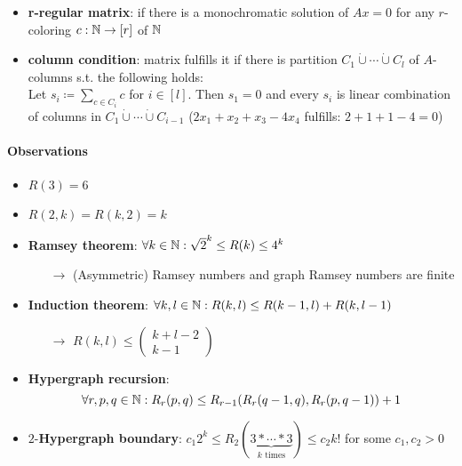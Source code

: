 \begin{itemize}
  \item \textbf{r-regular matrix}: if there is a monochromatic solution of \( Ax = 0 \) for any \( r \)-coloring \( c: \mathbb{N} \to [r] \) of \( \mathbb{N} \)
  \item \textbf{column condition}: matrix fulfills it if there is partition \( C_1 \dot{\cup} \cdots \dot{\cup} C_l \) of \( A \)-columns s.t. the following holds: \\
  Let \( s_i \coloneqq \sum_{c \in C_i}c \) for \( i \in [l] \). Then \( s_1 = 0 \) and every \( s_i \) is linear combination of columns in \( C_1 \dot{\cup} \cdots \dot{\cup} C_{i-1} \) (\( 2x_1 + x_2 + x_3 - 4x_4 \) fulfills: \( 2+1+1-4 = 0 \))
\end{itemize}

\paragraph{Observations}
\begin{itemize}
  \item \( R(3) = 6 \)
  \item \( R(2,k) = R(k,2) = k \)
  \item \textbf{Ramsey theorem}: \( \forall k \in \mathbb{N} : \sqrt{2}^k \leq R(k) \leq 4^k \)
  \begin{itemize}
    \item[\( \to \)] (Asymmetric) Ramsey numbers and graph Ramsey numbers are finite
  \end{itemize}
  \item \textbf{Induction theorem}: \( \forall k,l \in \mathbb{N} : R(k,l) \leq R(k-1,l) + R(k,l-1) \)
  \begin{itemize}
    \item[\( \to \)] \( R(k,l) \leq \left( \begin{smallmatrix}
      k+l-2 \\ k-1
    \end{smallmatrix} \right) \)
  \end{itemize}
  \item \textbf{Hypergraph recursion}:
  \begin{equation*}
    \forall r,p,q \in \mathbb{N} : R_r(p,q) \leq R_{r-1}(R_r(q-1,q),R_r(p,q-1)) + 1
  \end{equation*}
  \item \( 2 \)-\textbf{Hypergraph boundary}: \( c_1 2^k \leq R_2(\underbrace{3 * \cdots * 3}_{k \text{ times}}) \leq c_2 k! \) for some \( c_1, c_2 > 0 \)
\end{itemize}

